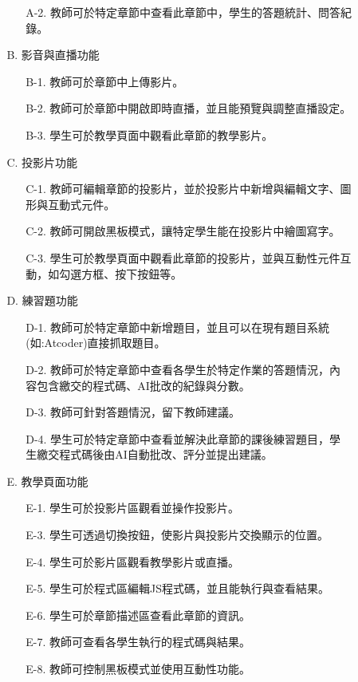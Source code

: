 \documentclass[12pt]{article}
\begin{document}
\begin{enumerate}
\begin{enumerate}
\begin{enumerate}
\begin{enumerate}
              \item [A-2.] 教師可於特定章節中查看此章節中，學生的答題統計、問答紀錄。
            \end{enumerate}
          \item [B.] 影音與直播功能
            \begin{enumerate}
              \item [B-1.] 教師可於章節中上傳影片。
              \item [B-2.] 教師可於章節中開啟即時直播，並且能預覽與調整直播設定。
              \item [B-3.] 學生可於教學頁面中觀看此章節的教學影片。
            \end{enumerate}
          \item [C.] 投影片功能
            \begin{enumerate}
              \item [C-1.] 教師可編輯章節的投影片，並於投影片中新增與編輯文字、圖形與互動式元件。
              \item [C-2.] 教師可開啟黑板模式，讓特定學生能在投影片中繪圖寫字。
              \item [C-3.] 學生可於教學頁面中觀看此章節的投影片，並與互動性元件互動，如勾選方框、按下按鈕等。
            \end{enumerate}
          \item [D.] 練習題功能
            \begin{enumerate}
              \item [D-1.] 教師可於特定章節中新增題目，並且可以在現有題目系統(如:Atcoder)直接抓取題目。
              \item [D-2.] 教師可於特定章節中查看各學生於特定作業的答題情況，內容包含繳交的程式碼、AI批改的紀錄與分數。
              \item [D-3.] 教師可針對答題情況，留下教師建議。
              \item [D-4.] 學生可於特定章節中查看並解決此章節的課後練習題目，學生繳交程式碼後由AI自動批改、評分並提出建議。
            \end{enumerate}
          \item [E.] 教學頁面功能
            \begin{enumerate}
              \item [E-1.] 學生可於投影片區觀看並操作投影片。
              \item [E-3.] 學生可透過切換按鈕，使影片與投影片交換顯示的位置。
              \item [E-4.] 學生可於影片區觀看教學影片或直播。
              \item [E-5.] 學生可於程式區編輯JS程式碼，並且能執行與查看結果。
              \item [E-6.] 學生可於章節描述區查看此章節的資訊。
              \item [E-7.] 教師可查看各學生執行的程式碼與結果。
              \item [E-8.] 教師可控制黑板模式並使用互動性功能。
            \end{enumerate}
          \end{enumerate}


\end{enumerate}
\end{enumerate}
\end{document}
